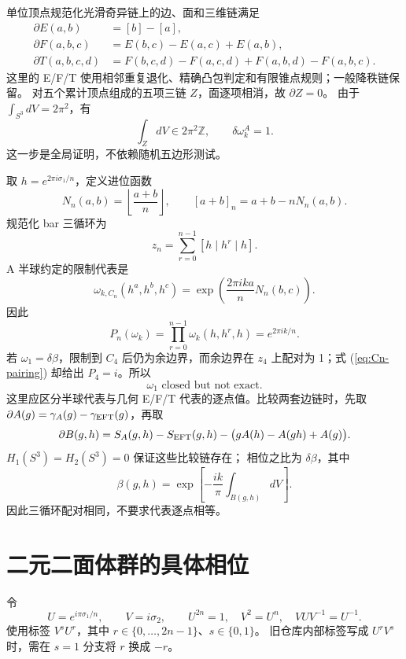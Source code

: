 \documentclass[UTF8,11pt,fontset=none]{ctexart}
\theoremstyle{definition}
\begin{document}
单位顶点规范化光滑奇异链上的边、面和三维链满足
\begin{align}
\partial E(a,b)&=[b]-[a],\\
\partial F(a,b,c)&=E(b,c)-E(a,c)+E(a,b),\\
\partial T(a,b,c,d)&=F(b,c,d)-F(a,c,d)+F(a,b,d)-F(a,b,c).
\end{align}
这里的 E/F/T 使用相邻重复退化、精确凸包判定和有限锥点规则；一般降秩链保留。
对五个累计顶点组成的五项三链 $Z$，面逐项相消，故 $\partial Z=0$。
由于 $\int_{S^3}dV=2\pi^2$，有
\[
\int_ZdV\in2\pi^2\mathbb Z,
\qquad \delta\omega_k^A=1.
\]
这一步是全局证明，不依赖随机五边形测试。

取 $h=e^{2\pi i\sigma_1/n}$，定义进位函数
\[
N_n(a,b)=\left\lfloor\frac{a+b}{n}\right\rfloor,
\qquad [a+b]_n=a+b-nN_n(a,b).
\]
规范化 bar 三循环为
\[
z_n=\sum_{r=0}^{n-1}[h\mid h^r\mid h].
\]
A 半球约定的限制代表是
\begin{equation}
\omega_{k,C_n}(h^a,h^b,h^c)=
\exp\left(\frac{2\pi i k a}{n}N_n(b,c)\right).
\label{eq:Cn-cocycle}
\end{equation}
因此
\begin{equation}
P_n(\omega_k)=\prod_{r=0}^{n-1}\omega_k(h,h^r,h)=e^{2\pi ik/n}.
\label{eq:Cn-pairing}
\end{equation}
若 $\omega_1=\delta\beta$，限制到 $C_4$ 后仍为余边界，而余边界在 $z_4$ 上配对为 1；式 (\ref{eq:Cn-pairing}) 却给出 $P_4=i$。所以
\[
\boxed{\omega_1\text{ closed but not exact}.}
\]
这里应区分半球代表与几何 E/F/T 代表的逐点值。比较两套边链时，先取
$\partial A(g)=\gamma_A(g)-\gamma_{\rm EFT}(g)$，再取
\[
\partial B(g,h)=S_A(g,h)-S_{\rm EFT}(g,h)
-\bigl(gA(h)-A(gh)+A(g)\bigr).
\]
$H_1(S^3)=H_2(S^3)=0$ 保证这些比较链存在；
相位之比为 $\delta\beta$，其中
\[
\beta(g,h)=\exp\left[-\frac{ik}{\pi}\int_{B(g,h)}dV\right].
\]
因此三循环配对相同，不要求代表逐点相等。

\section{二元二面体群的具体相位}

令
\[
U=e^{i\pi\sigma_1/n},\qquad V=i\sigma_2,
\qquad U^{2n}=1,\quad V^2=U^n,\quad VUV^{-1}=U^{-1}.
\]
使用标签 $V^sU^r$，其中 $r\in\{0,\ldots,2n-1\}$、$s\in\{0,1\}$。
旧仓库内部标签写成 $U^rV^s$ 时，需在 $s=1$ 分支将 $r$ 换成 $-r$。
\end{document}
